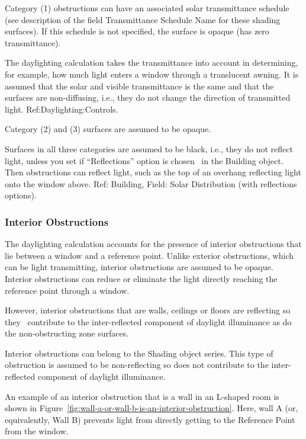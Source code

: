 Category (1) obstructions can have an associated solar transmittance schedule (see description of the field Transmittance Schedule Name for these shading surfaces). If this schedule is not specified, the surface is opaque (has zero transmittance).

The daylighting calculation takes the transmittance into account in determining, for example, how much light enters a window through a translucent awning. It is assumed that the solar and visible transmittance is the same and that the surfaces are non-diffusing, i.e., they do not change the direction of transmitted light. Ref:Daylighting:Controls.

Category (2) and (3) surfaces are assumed to be opaque.

Surfaces in all three categories are assumed to be black, i.e., they do not reflect light, unless you set if ``Reflections'' option is chosen~ in the Building object. Then obstructions can reflect light, such as the top of an overhang reflecting light onto the window above. Ref: Building, Field: Solar Distribution (with reflections options).

\subsubsection{Interior Obstructions}\label{interior-obstructions}

The daylighting calculation accounts for the presence of interior obstructions that lie between a window and a reference point. Unlike exterior obstructions, which can be light transmitting, interior obstructions are assumed to be opaque. Interior obstructions can reduce or eliminate the light directly reaching the reference point through a window.

However, interior obstructions that are walls, ceilings or floors are reflecting so they~ contribute to the inter-reflected component of daylight illuminance as do the non-obstructing zone surfaces.

Interior obstructions can belong to the Shading object series. This type of obstruction is assumed to be non-reflecting so does not contribute to the inter-reflected component of daylight illuminance.

An example of an interior obstruction that is a wall in an L-shaped room is shown in Figure~\ref{fig:wall-a-or-wall-b-is-an-interior-obstruction}. Here, wall A (or, equivalently, Wall B) prevents light from directly getting to the Reference Point from the window.

